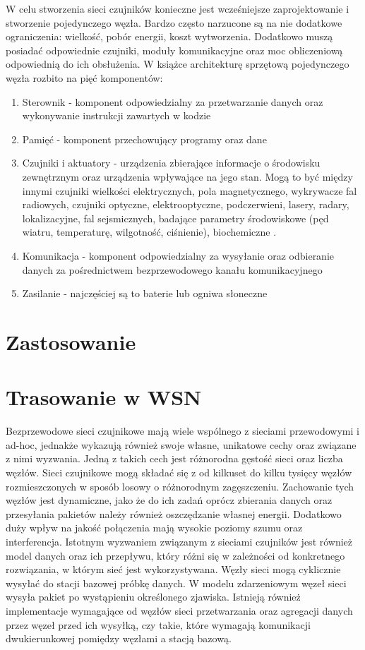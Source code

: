 W celu stworzenia sieci czujników konieczne jest wcześniejsze zaprojektowanie i stworzenie pojedynczego węzła. Bardzo często narzucone są na nie dodatkowe ograniczenia: wielkość, pobór energii, koszt wytworzenia. Dodatkowo muszą posiadać odpowiednie czujniki, moduły komunikacyjne oraz moc obliczeniową odpowiednią do ich obsłużenia. W książce \cite{Karl2006} architekturę sprzętową pojedynczego węzła rozbito na pięć komponentów:
\begin{enumerate}
	\item Sterownik - komponent odpowiedzialny za przetwarzanie danych oraz wykonywanie instrukcji zawartych w kodzie
	\item Pamięć - komponent przechowujący programy oraz dane
	\item Czujniki i aktuatory - urządzenia zbierające informacje o środowisku zewnętrznym oraz urządzenia wpływające na jego stan. Mogą to być między innymi czujniki wielkości elektrycznych, pola magnetycznego, wykrywacze fal radiowych, czujniki optyczne, elektrooptyczne, podczerwieni, lasery, radary, lokalizacyjne, fal sejsmicznych, badające parametry środowiskowe (pęd wiatru, temperaturę, wilgotność, ciśnienie), biochemiczne \cite{Sohraby2006}.
	\item Komunikacja - komponent odpowiedzialny za wysyłanie oraz odbieranie danych za pośrednictwem bezprzewodowego kanału komunikacyjnego
	\item Zasilanie - najczęściej są to baterie lub ogniwa słoneczne
\end{enumerate}
\section{Zastosowanie}
\section{Trasowanie w WSN}
Bezprzewodowe sieci czujnikowe mają wiele wspólnego z sieciami przewodowymi i ad-hoc, jednakże wykazują również swoje własne, unikatowe cechy oraz związane z nimi wyzwania.
Jedną z takich cech jest różnorodna gęstość sieci oraz liczba węzłów. Sieci czujnikowe mogą składać się z od kilkuset do kilku tysięcy węzłów rozmieszczonych w sposób losowy o różnorodnym zagęszczeniu. Zachowanie tych węzłów jest dynamiczne, jako że do ich zadań oprócz zbierania danych oraz przesyłania pakietów należy również oszczędzanie własnej energii. Dodatkowo duży wpływ na jakość połączenia mają wysokie poziomy szumu oraz interferencja.
Istotnym wyzwaniem związanym z sieciami czujników jest również model danych oraz ich przepływu, który różni się w zależności od konkretnego rozwiązania, w którym sieć jest wykorzystywana. Węzły sieci mogą cyklicznie wysyłać do stacji bazowej próbkę danych. W modelu zdarzeniowym węzeł sieci wysyła pakiet po wystąpieniu określonego zjawiska. Istnieją również implementacje wymagające od węzłów sieci przetwarzania oraz agregacji danych przez węzeł przed ich wysyłką, czy takie, które wymagają komunikacji dwukierunkowej pomiędzy węzłami a stacją bazową.


